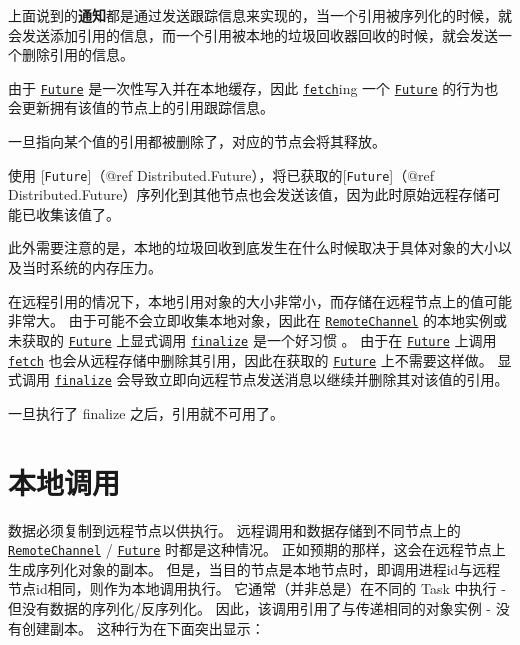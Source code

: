 上面说到的\textbf{通知}都是通过发送{\textquotedbl}跟踪{\textquotedbl}信息来实现的，当一个引用被序列化的时候，就会发送{\textquotedbl}添加引用{\textquotedbl}的信息，而一个引用被本地的垃圾回收器回收的时候，就会发送一个{\textquotedbl}删除引用{\textquotedbl}的信息。



由于 \hyperlink{4170271048165085864}{\texttt{Future}} 是一次性写入并在本地缓存，因此 \hyperlink{11007884648860062495}{\texttt{fetch}}ing 一个 \hyperlink{4170271048165085864}{\texttt{Future}} 的行为也会更新拥有该值的节点上的引用跟踪信息。



一旦指向某个值的引用都被删除了，对应的节点会将其释放。



使用 [\texttt{Future}]（@ref Distributed.Future），将已获取的[\texttt{Future}]（@ref Distributed.Future）序列化到其他节点也会发送该值，因为此时原始远程存储可能已收集该值了。



此外需要注意的是，本地的垃圾回收到底发生在什么时候取决于具体对象的大小以及当时系统的内存压力。



在远程引用的情况下，本地引用对象的大小非常小，而存储在远程节点上的值可能非常大。 由于可能不会立即收集本地对象，因此在 \hyperlink{16773267780467157552}{\texttt{RemoteChannel}} 的本地实例或未获取的 \hyperlink{4170271048165085864}{\texttt{Future}} 上显式调用 \hyperlink{6584919147438336166}{\texttt{finalize}} 是一个好习惯 。 由于在 \hyperlink{4170271048165085864}{\texttt{Future}} 上调用 \hyperlink{11007884648860062495}{\texttt{fetch}} 也会从远程存储中删除其引用，因此在获取的 \hyperlink{4170271048165085864}{\texttt{Future}} 上不需要这样做。 显式调用 \hyperlink{6584919147438336166}{\texttt{finalize}} 会导致立即向远程节点发送消息以继续并删除其对该值的引用。



一旦执行了 finalize 之后，引用就不可用了。



\hypertarget{13178697960111882092}{}


\section{本地调用}



数据必须复制到远程节点以供执行。 远程调用和数据存储到不同节点上的 \hyperlink{16773267780467157552}{\texttt{RemoteChannel}} / \hyperlink{4170271048165085864}{\texttt{Future}} 时都是这种情况。 正如预期的那样，这会在远程节点上生成序列化对象的副本。 但是，当目的节点是本地节点时，即调用进程id与远程节点id相同，则作为本地调用执行。 它通常（并非总是）在不同的 Task 中执行 - 但没有数据的序列化/反序列化。 因此，该调用引用了与传递相同的对象实例 - 没有创建副本。 这种行为在下面突出显示：




